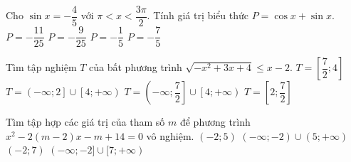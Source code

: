 \begin{ex}%
	Cho $ \sin x=-\dfrac{4}{5} $ với $ \pi<x<\dfrac{3\pi }{2} $. Tính giá trị biểu thức $ P=\cos x+\sin x $.
	\choice
	{$P=-\dfrac{11}{25}$}
	{$P=-\dfrac{9}{25}$}
	{$P=-\dfrac{1}{5}$}
	{\True $P=-\dfrac{7}{5}$}
\end{ex}
\begin{ex}%
	Tìm tập nghiệm $ T $ của bất phương trình $ \sqrt{-x^2+3x+4}\leq x-2 $.
	\choice
	{\True $T=\left[ \dfrac{7}{2};4\right]$}
	{$T=\left(-\infty;2\right]\cup\left[4;+\infty\right)$}
	{$T=\left(-\infty;\dfrac{7}{2}\right]\cup\left[4;+\infty\right)$}
	{$T=\left[ 2;\dfrac{7}{2}\right]$}
\end{ex}
\begin{ex}%
	Tìm tập hợp các giá trị của tham số $ m $ để phương trình $ x^2-2(m-2)x-m+14=0 $ vô nghiệm.
	\choice
	{\True $(-2;5)$}
	{$(-\infty;-2)\cup(5;+\infty)$}
	{$(-2;7)$}
	{$(-\infty;-2]\cup[7;+\infty)$}
\end{ex}
